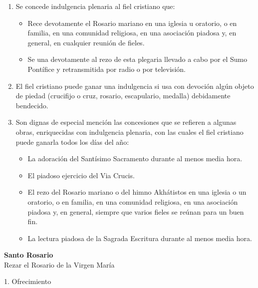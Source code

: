 \documentclass[12pt, letterpaper]{report}
\begin{document}
    \begin{enumerate}
      \item Se concede indulgencia plenaria al fiel cristiano que:
      \begin{itemize}
        \item Rece devotamente el Rosario mariano en una iglesia u oratorio, o en familia, en una comunidad religiosa, en una asociación piadosa y, en general, en cualquier reunión de fieles.\cite{Indulgencias}
        \item Se una devotamente al rezo de esta plegaria llevado a cabo por el Sumo Pontífice y retransmitida por radio o por televisión.\cite{Indulgencias}
      \end{itemize}
      \item El fiel cristiano puede ganar una indulgencia si usa con devoción algún objeto de piedad (crucifijo o cruz, rosario, escapulario, medalla) debidamente bendecido.
      \item Son dignas de especial mención las concesiones que se refieren a algunas obras, enriquecidas con indulgencia plenaria, con las cuales el fiel cristiano puede ganarla todos los días del año:
      \begin{itemize}
        \item La adoración del Santísimo Sacramento durante al menos media hora.\cite{Indulgencias}
        \item El piadoso ejercicio del Via Crucis.\cite{Indulgencias}
        \item El rezo del Rosario mariano o del himno Akhátistos en una iglesia o un oratorio, o en familia, en una comunidad religiosa, en una asociación piadosa y, en general, siempre que varios fieles se reúnan para un buen fin.\cite{Indulgencias}
        \item La lectura piadosa de la Sagrada Escritura durante al menos media hora.\cite{Indulgencias}
      \end{itemize}
    \end{enumerate}
    \clearpage
    
    \begin{center}
        \vspace*{8cm}
        \textbf{\Huge Santo Rosario}\\
        \vspace*{1cm}
        \Large Rezar el Rosario de la Virgen María\cite{VaticanRosary}
    \end{center}
    \clearpage
    
    \LARGE 1. Ofrecimiento
    
\end{document}
